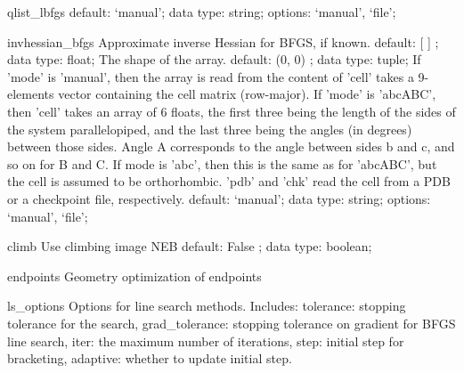 \begin{ipifield}{}
\begin{ipifield}{qlist\_lbfgs}
{{default: `manual'; data type: string; options: `manual', `file'; }%
}
\end{ipifield}
\begin{ipifield}{invhessian\_bfgs}%
{Approximate inverse Hessian for BFGS, if known.}%
{default:  [ ] ; data type: float; }%
{%
{The shape of the array.}%
{default:  (0, 0) ; data type: tuple; }%
%
{If 'mode' is 'manual', then the array is read from the content of 'cell' takes a 9-elements vector containing the cell matrix (row-major). If 'mode' is 'abcABC', then 'cell' takes an array of 6 floats, the first three being the length of the sides of the system parallelopiped, and the last three being the angles (in degrees) between those sides. Angle A corresponds to the angle between sides b and c, and so on for B and C. If mode is 'abc', then this is the same as for 'abcABC', but the cell is assumed to be orthorhombic. 'pdb' and 'chk' read the cell from a PDB or a checkpoint file, respectively.}%
{default: `manual'; data type: string; options: `manual', `file'; }%
}
\end{ipifield}
\begin{ipifield}{climb}%
{Use climbing image NEB}%
{default:  False ; data type: boolean; }%
{}
\end{ipifield}
\begin{ipifield}{endpoints}%
{Geometry optimization of endpoints}%
{}%
{}
\end{ipifield}
\begin{ipifield}{ls\_options}%
{Options for line search methods. Includes:
                              tolerance: stopping tolerance for the search,
                              grad\_tolerance: stopping tolerance on gradient for
                              BFGS line search,
                              iter: the maximum number of iterations,
                              step: initial step for bracketing,
                              adaptive: whether to update initial step.
                              }%
{}%
{}
\end{ipifield}
\end{ipifield}
